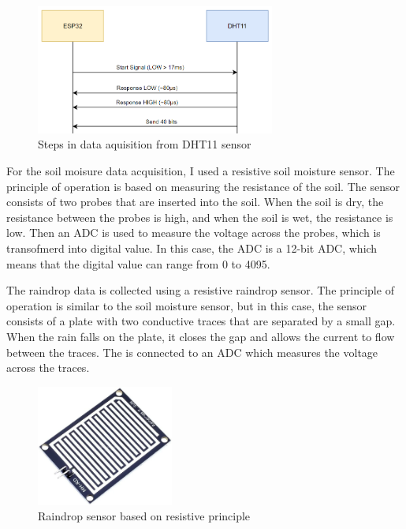 \begin{figure}[H]
    \centering
    \includegraphics[width=0.7\textwidth]{images/dht-steps.png}
    \caption{Steps in data aquisition from DHT11 sensor}
    \label{fig:dht-steps}
\end{figure}

For the soil moisure data acquisition, I used a resistive soil moisture sensor. The principle of operation is based
on measuring the resistance of the soil. The sensor consists of two probes that are inserted into the soil.
When the soil is dry, the resistance between the probes is high, and when the soil is wet, the resistance is low\cite{s20020363}.
Then an ADC is used to measure the voltage across the probes, which is transofmerd into digital value. In this case, the
ADC is a 12-bit ADC, which means that the digital value can range from 0 to 4095.

The raindrop data is collected using a resistive raindrop sensor. The principle of operation is similar to the soil moisture sensor, but 
in this case, the sensor consists of a plate with two conductive traces that are separated by a small gap.
When the rain falls on the plate, it closes the gap and allows the current to flow between the traces. The 
is connected to an ADC which measures the voltage across the traces.

\begin{figure}[H]
    \centering
    \includegraphics[width=0.4\textwidth]{images/rain-detector-sensor.png}
    \caption{Raindrop sensor based on resistive principle}
    \label{fig:raindrop-sensor}
\end{figure}

